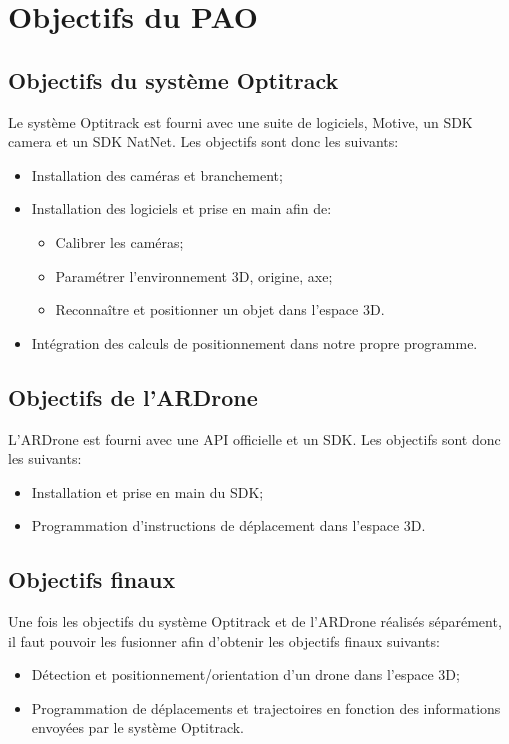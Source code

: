 \chapter{Objectifs du PAO}
	\section{Objectifs du système Optitrack}
		Le système Optitrack est fourni avec une suite de logiciels, Motive, un SDK camera et un SDK NatNet. Les objectifs sont donc les suivants: \\
		\begin{itemize}
			\item Installation des caméras et branchement;
			\item Installation des logiciels et prise en main afin de:
			\begin{itemize}
				\item Calibrer les caméras;
				\item Paramétrer l'environnement 3D, origine, axe;
				\item Reconnaître et positionner un objet dans l'espace 3D\@.
			\end{itemize}
			\item Intégration des calculs de positionnement dans notre propre programme.
		\end{itemize}


	\section{Objectifs de l'ARDrone}
		L'ARDrone est fourni avec une API officielle et un SDK\@. Les objectifs sont donc les suivants: \\
		\begin{itemize}
			\item Installation et prise en main du SDK\@;
			\item Programmation d'instructions de déplacement dans l'espace 3D\@.
		\end{itemize}


	\section{Objectifs finaux}
		Une fois les objectifs du système Optitrack et de l'ARDrone réalisés séparément, il faut pouvoir les fusionner afin d'obtenir les objectifs finaux suivants: \\
		\begin{itemize}
			\item Détection et positionnement/orientation d'un drone dans l'espace 3D\@;
			\item Programmation de déplacements et trajectoires en fonction des informations envoyées par le système Optitrack.
		\end{itemize}
